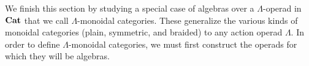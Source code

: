 We finish this section by studying a special case of algebras over a $\Lambda$-operad in $\mathbf{Cat}$ that we call $\Lambda$-monoidal categories.
These generalize the various kinds of monoidal categories (plain, symmetric, and braided) to any action operad $\Lambda$.
In order to define $\Lambda$-monoidal categories, we must first construct the operads for which they will be algebras.

%
%
%
%
%
%
